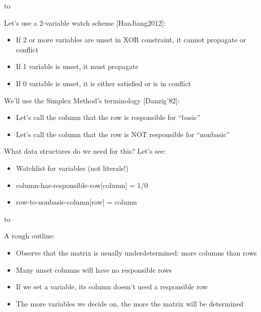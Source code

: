 \documentclass[aspectratio=196]{slides}
\def\TITLE#1{\hbox to \linewidth{\large #1\hfill}}
\def\BOTTOM{\vfill\newpage}
\def\SLIDE#1{\BOTTOM\TITLE{#1}}
\begin{document}
\vfill
\newpage
\SLIDE{CDCL(T) Gauss-Jordan Elimination: 2-variable watchlist scheme}
\vspace{2ex}

Let's use a 2-variable watch scheme [HanJiang2012]:
\begin{itemize}
\item If 2 or more variables are unset in XOR constraint, it cannot propagate or conflict
\item If 1 variable is unset, it must propagate
\item If 0 variable is unset, it is either satisfied or is in conflict
\end{itemize}

We'll use the Simplex Method's terminology [Danzig'82]:
\begin{itemize}
\item Let's call the column that the row is responsible for ``basic''
\item Let's call the column that the row is NOT responsible for ``nonbasic''
\end{itemize}

What data structures do we need for this? Let's see:
\begin{itemize}
\item Watchlist for variables (not literals!)
\item column-has-responsible-row[column] = 1/0
\item row-to-nonbasic-column[row] = column
\end{itemize}
\vfill
\newpage
\SLIDE{CDCL(T) Gauss-Jordan Elimination: Propagation}
\vspace{2ex}

A rough outline:
\begin{itemize}
\item Observe that the matrix is usually underdetermined: more columns than rows
\item Many unset columns will have no responsible rows
\item If we set a variable, its column doesn't need a responsible row
\item The more variables we decide on, the more the matrix will be determined
\end{itemize}
\end{document}
